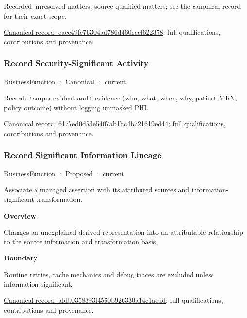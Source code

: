 {\small Recorded unresolved matters: source-qualified matters; see the canonical record for their exact scope.}\par
{\footnotesize \href{../../../../continuum/business/business-function/eace49fe7b304ad786d460ccef622378.md}{Canonical record: eace49fe7b304ad786d460ccef622378}; full qualifications, contributions and provenance.}\par
\subsubsection{Record Security-Significant Activity}

\label{element:6177ed0d53e5407ab1bc4b721619ed44}
{\small BusinessFunction · Canonical · current}\par

Records tamper-evident audit evidence (who, what, when, why, patient MRN, policy outcome) without logging unmasked PHI.


{\footnotesize \href{../../../../continuum/business/business-function/6177ed0d53e5407ab1bc4b721619ed44.md}{Canonical record: 6177ed0d53e5407ab1bc4b721619ed44}; full qualifications, contributions and provenance.}\par
\subsubsection{Record Significant Information Lineage}

\label{element:afdb0358393f4560b926330a14c1aedd}
{\small BusinessFunction · Proposed · current}\par

Associate a managed assertion with its attributed sources and information-significant transformation.



\textbf{Overview}



Changes an unexplained derived representation into an attributable relationship to the source information and transformation basis.



\textbf{Boundary}



Routine retries, cache mechanics and debug traces are excluded unless information-significant.


{\footnotesize \href{../../../../continuum/business/business-function/afdb0358393f4560b926330a14c1aedd.md}{Canonical record: afdb0358393f4560b926330a14c1aedd}; full qualifications, contributions and provenance.}\par
